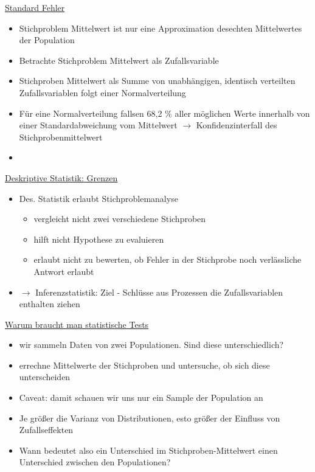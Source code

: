\documentclass[a4paper,10pt,oneside]{article}
\begin{document}
\underline{Standard Fehler} \\
 	\begin{itemize}
 		\item Stichproblem Mittelwert ist nur eine Approximation desechten Mittelwertes der Population
 		\item Betrachte Stichproblem Mittelwert als Zufallsvariable
 		\item Stichproben Mittelwert als Summe von unabhängigen, identisch verteilten Zufallsvariablen folgt einer Normalverteilung 
 		\item Für eine Normalverteilung fallsen 68,2 \% aller möglichen Werte innerhalb von einer Standardabweichung vom Mittelwert $\rightarrow$ Konfidenzinterfall des Stichprobenmittelwert
 		\item[] %
 	\end{itemize}
 	
\underline{Deskriptive Statistik: Grenzen} \\
	\begin{itemize}
		\item Des. Statistik erlaubt Stichproblemanalyse
			\begin{itemize}
				\item vergleicht nicht zwei verschiedene Stichproben
				\item hilft nicht Hypothese zu evaluieren
				\item erlaubt nicht zu bewerten, ob Fehler in der Stichprobe noch verlässliche Antwort erlaubt
			\end{itemize}
		\item $\rightarrow$ Inferenzstatistik: Ziel - Schlüsse aus Prozessen die Zufallsvariablen enthalten ziehen
	\end{itemize}
 	
\underline{Warum braucht man statistische Tests} \\
	\begin{itemize}
		\item wir sammeln Daten von zwei Populationen. Sind diese unterschiedlich?
		\item errechne Mittelwerte der Stichproben und untersuche, ob sich diese unterscheiden
		\item Caveat: damit schauen wir uns nur ein Sample der Population an
		\item Je größer die Varianz von Distributionen, esto größer der Einfluss von Zufallseffekten
		\item Wann bedeutet also ein Unterschied im Stichproben-Mittelwert einen Unterschied zwischen den Populationen?
	\end{itemize}
 		
\end{document}
